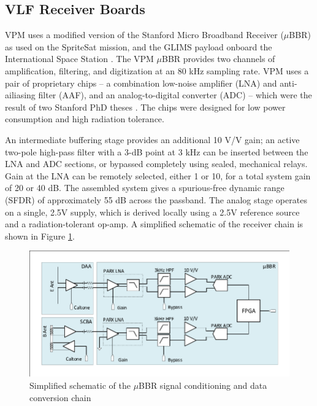 \subsection{VLF Receiver Boards}
VPM uses a modified version of the Stanford Micro Broadband Receiver ($\mu$BBR) as used on the SpriteSat mission, and the GLIMS payload onboard the International Space Station \citep{Ushio2011}. The VPM $\mu$BBR provides two channels of amplification, filtering, and digitization at an 80 kHz sampling rate. VPM uses a pair of proprietary chips -- a combination low-noise amplifier (LNA) and anti-ailiasing filter (AAF), and an analog-to-digital converter (ADC) -- which were the result of two Stanford PhD theses \citep{Wang2009, Mossawir2009}. The chips were designed for low power consumption and high radiation tolerance.

An intermediate buffering stage provides an additional 10 V/V gain; an active two-pole high-pass filter with a 3-dB point at 3 kHz can be inserted between the LNA and ADC sections, or bypassed completely using sealed, mechanical relays. Gain at the LNA can be remotely selected, either 1 or 10, for a total system gain of 20 or 40 dB. The assembled system gives a spurious-free dynamic range (SFDR) of approximately 55 dB across the passband. The analog stage operates on a single, 2.5V supply, which is derived locally using a 2.5V reference source and a radiation-tolerant op-amp. A simplified schematic of the receiver chain is shown in Figure \ref{fig:ubbr_schem}.

\begin{figure}[t]
\begin{center}
\includegraphics[width=35pc]{figures/vpm_figures/ubbr_schem_with_preamps-2.pdf}

\caption{Simplified schematic of the $\mu$BBR signal conditioning and data conversion chain}
\label{fig:ubbr_schem}
\end{center}
\end{figure}

